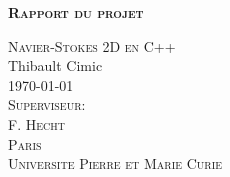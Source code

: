 \begin{titlepage}
	\begin{center}
		\vspace*{2.5cm}
		\textbf{
		\huge{
		\textsc{Rapport du projet}\\}}

		\vspace{5cm}

		\LARGE{
		\textsc{Navier-Stokes 2D en C++}\\[0.5\baselineskip]
		Thibault Cimic\\

		\vspace{5cm}
		\textsc{\today}\\ 

		\vspace{1cm}
		\textsc{Superviseur:\\
		F. Hecht}\\

		\vspace{1cm}
		\textsc{Paris\\
		Universite Pierre et Marie Curie}\\}

		\end{center}

\end{titlepage}